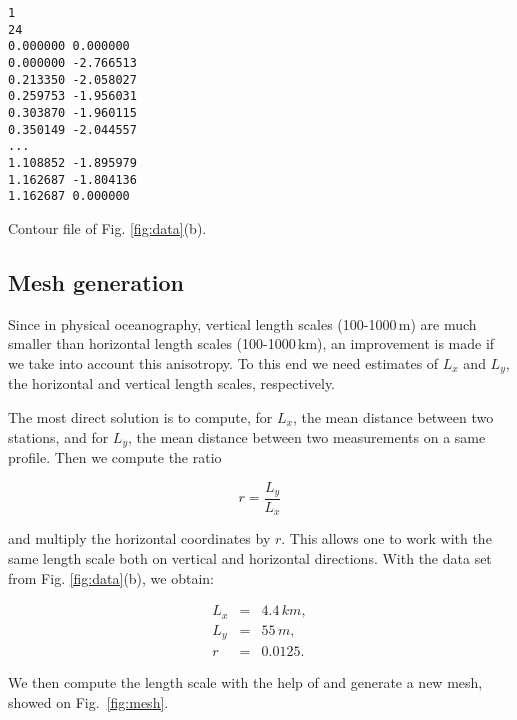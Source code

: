 \begin{exfile}
\begin{footnotesize}
\begin{verbatim}
1 
24 
0.000000 0.000000 
0.000000 -2.766513 
0.213350 -2.058027 
0.259753 -1.956031 
0.303870 -1.960115 
0.350149 -2.044557 
...
1.108852 -1.895979 
1.162687 -1.804136 
1.162687 0.000000 

\end{verbatim}
\end{footnotesize}
\caption{Contour file of Fig. \ref{fig:data}(b).\label{exfile:contour}}
\end{exfile}


\subsection{Mesh generation\label{sec:meshscale}}



Since in physical oceanography, vertical length scales (100-1000\,m) are much smaller than horizontal length scales (100-1000\,km), an improvement is  made if we take into account this anisotropy. To this end we need estimates of $L_{x}$ and $L_{y}$, the horizontal and vertical length scales, respectively.


The most direct solution is to compute, for $L_{x}$, the mean distance between two stations, and for $L_{y}$, the mean distance between two measurements on a same profile. Then we compute the ratio

\[r = \frac{L_y}{L_x}\]

and multiply the horizontal coordinates by $r$. This allows one to work with the same length scale both on vertical and horizontal directions. With the  data set from Fig. \ref{fig:data}(b), we obtain:

\begin{eqnarray*}
L_{x} &=& 4.4\,km,\\
L_{y} &=& 55\,m,\\
	r   &=& 0.0125.
\end{eqnarray*}

We then compute the length scale with the help of  and generate a new mesh, showed on Fig.~\ref{fig:mesh}. 

